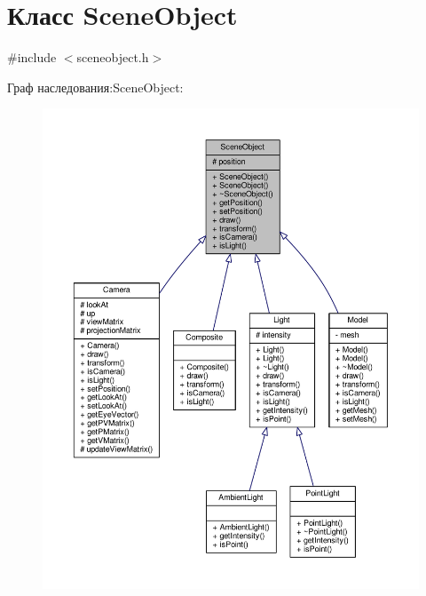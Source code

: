 \hypertarget{class_scene_object}{}\section{Класс Scene\+Object}
\label{class_scene_object}


{\ttfamily \#include $<$sceneobject.\+h$>$}



Граф наследования\+:Scene\+Object\+:
\nopagebreak
\begin{figure}[H]
\begin{center}
\leavevmode
\includegraphics[width=350pt]{dd/d9f/class_scene_object__inherit__graph}
\end{center}
\end{figure}


